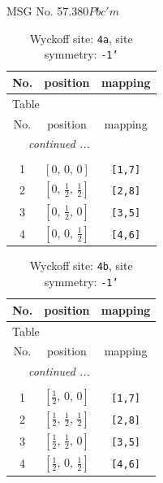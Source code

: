 \documentclass[fleqn,8pt]{jsarticle}
\begin{document}
\setcounter{MaxMatrixCols}{32}

\renewcommand{\tablename}{Table~}
\renewcommand{\figurename}{Figure~}
\begin{center}
\LARGE
MSG No. 57.380\quad$Pbc'm$
\end{center}
\renewcommand{\arraystretch}{1.2}
\begin{longtable}{ccc}
\caption{Wyckoff site: {\tt 4a}, site symmetry: {\tt -1'}}
 \\
 \hline \hline
No. & position & mapping \\ \hline \endfirsthead

\multicolumn{2}{l}{\tablename\ \thetable{}} \\
 \hline \hline
No. & position & mapping \\ \hline \endhead

 \hline \hline
\multicolumn{2}{r}{\footnotesize\it continued ...} \\ \endfoot

 \hline \hline
\multicolumn{2}{r}{} \\ \endlastfoot

1 & $\left[ 0,\, 0,\, 0 \right]$ & {\tt [1,7]} \\ \hline
2 & $\left[ 0,\, \frac{1}{2},\, \frac{1}{2} \right]$ & {\tt [2,8]} \\ \hline
3 & $\left[ 0,\, \frac{1}{2},\, 0 \right]$ & {\tt [3,5]} \\ \hline
4 & $\left[ 0,\, 0,\, \frac{1}{2} \right]$ & {\tt [4,6]} \\
\end{longtable}
\renewcommand{\arraystretch}{1.2}
\begin{longtable}{ccc}
\caption{Wyckoff site: {\tt 4b}, site symmetry: {\tt -1'}}
 \\
 \hline \hline
No. & position & mapping \\ \hline \endfirsthead

\multicolumn{2}{l}{\tablename\ \thetable{}} \\
 \hline \hline
No. & position & mapping \\ \hline \endhead

 \hline \hline
\multicolumn{2}{r}{\footnotesize\it continued ...} \\ \endfoot

 \hline \hline
\multicolumn{2}{r}{} \\ \endlastfoot

1 & $\left[ \frac{1}{2},\, 0,\, 0 \right]$ & {\tt [1,7]} \\ \hline
2 & $\left[ \frac{1}{2},\, \frac{1}{2},\, \frac{1}{2} \right]$ & {\tt [2,8]} \\ \hline
3 & $\left[ \frac{1}{2},\, \frac{1}{2},\, 0 \right]$ & {\tt [3,5]} \\ \hline
4 & $\left[ \frac{1}{2},\, 0,\, \frac{1}{2} \right]$ & {\tt [4,6]} \\
\end{longtable}
\end{document}
